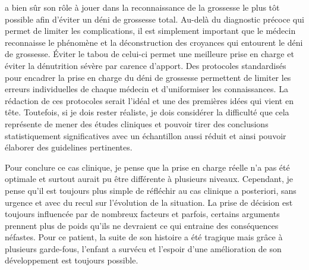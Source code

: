  a bien sûr son rôle à jouer dans la reconnaissance de la grossesse le plus tôt possible afin d’éviter un déni de grossesse total. Au-delà du diagnostic précoce qui permet de limiter les complications, il est simplement important que le médecin reconnaisse le phénomène et la déconstruction des croyances qui entourent le déni de grossesse. Éviter le tabou de celui-ci permet une meilleure prise en charge et éviter la dénutrition sévère par carence d’apport. Des protocoles standardisés pour encadrer la prise en charge du déni de grossesse permettent de limiter les erreurs individuelles de chaque médecin et d’uniformiser les connaissances. La rédaction de ces protocoles serait l’idéal et une des premières idées qui vient en tête. Toutefois, si je dois rester réaliste, je dois considérer la difficulté que cela représente de mener des études cliniques et pouvoir tirer des conclusions statistiquement significatives avec un échantillon aussi réduit et ainsi pouvoir élaborer des guidelines pertinentes.

Pour conclure ce cas clinique, je pense que la prise en charge réelle n’a pas été optimale et surtout aurait pu être différente à plusieurs niveaux. Cependant, je pense qu’il est toujours plus simple de réfléchir au cas clinique a posteriori, sans urgence et avec du recul sur l’évolution de la situation. La prise de décision est toujours influencée par de nombreux facteurs et parfois, certains arguments prennent plus de poids qu’ils ne devraient ce qui entraine des conséquences néfastes. Pour ce patient, la suite de son histoire a été tragique mais grâce à plusieurs garde-fous, l’enfant a survécu et l’espoir d’une amélioration de son développement est toujours possible.

